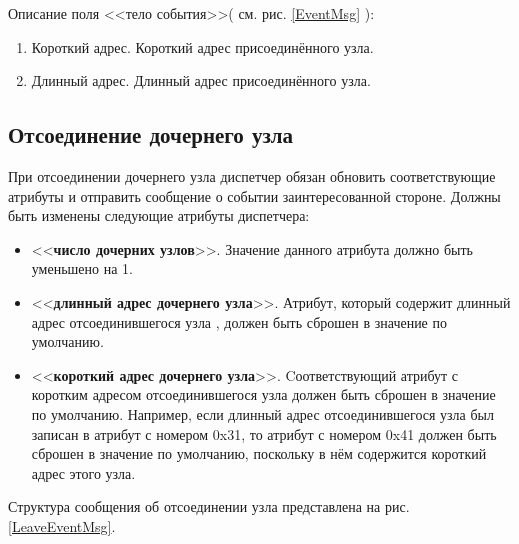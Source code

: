 Описание поля <<тело события>>( см. рис. \ref{EventMsg} ):
\begin{enumerate}
\item Короткий адрес. Короткий адрес присоединённого узла.
\item Длинный адрес. Длинный адрес присоединённого узла. 
\end{enumerate}

\subsection{Отсоединение дочернего узла} 
\label{LeaveNode}

    При отсоединении дочернего узла диспетчер обязан обновить соответствующие атрибуты
и отправить сообщение о событии заинтересованной стороне. Должны быть изменены следующие
атрибуты диспетчера:
\begin{itemize}
\item <<{\bfseries число дочерних узлов}>>. Значение данного атрибута должно быть уменьшено на 1.
\item <<{\bfseries длинный адрес дочернего узла}>>. Атрибут, который содержит длинный адрес отсоединившегося узла
, должен быть сброшен в значение по умолчанию.
\item <<{\bfseries короткий адрес дочернего узла}>>. Cоответствующий атрибут с коротким адресом отсоединившегося узла
должен быть сброшен в значение по умолчанию. Например, если длинный адрес отсоединившегося узла был записан в атрибут 
с номером 0x31, то атрибут с номером 0x41 должен быть сброшен в значение по умолчанию, поскольку в нём содержится
короткий адрес этого узла.
\end{itemize}

Структура сообщения об отсоединении узла представлена на рис. \ref{LeaveEventMsg}.

